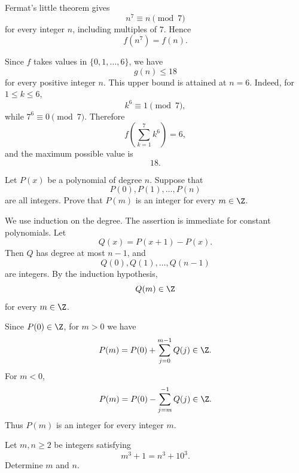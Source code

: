     \begin{solution}
        Fermat's little theorem gives
        \[
            n^7\equiv n\pmod7
        \]
        for every integer $n$, including multiples of $7$. Hence
        \[
            f(n^7)=f(n).
        \]

        Since $f$ takes values in $\{0,1,\ldots,6\}$, we have
        \[
            g(n)\leq18
        \]
        for every positive integer $n$. This upper bound is attained at $n=6$.
        Indeed, for $1\leq k\leq6$,
        \[
            k^6\equiv1\pmod7,
        \]
        while $7^6\equiv0\pmod7$. Therefore
        \[
            f\left(\sum_{k=1}^{7}k^6\right)=6,
        \]
        and the maximum possible value is
        \[
            \boxed{18}.
        \]
    \end{solution}

    \begin{expectedproblem}
        Let $P(x)$ be a polynomial of degree $n$. Suppose that
        \[
            P(0),P(1),\ldots,P(n)
        \]
        are all integers. Prove that $P(m)$ is an integer for every
        $m\in\Z$.
    \end{expectedproblem}

    \begin{solution}
        We use induction on the degree. The assertion is immediate for constant
        polynomials. Let
        \[
            Q(x)=P(x+1)-P(x).
        \]
        Then $Q$ has degree at most $n-1$, and
        \[
            Q(0),Q(1),\ldots,Q(n-1)
        \]
        are integers. By the induction hypothesis,
        \[
            Q(m)\in\Z
        \]
        for every $m\in\Z$.

        Since $P(0)\in\Z$, for $m>0$ we have
        \[
            P(m)
            =
            P(0)+\sum_{j=0}^{m-1}Q(j)
            \in\Z.
        \]
        For $m<0$,
        \[
            P(m)
            =
            P(0)-\sum_{j=m}^{-1}Q(j)
            \in\Z.
        \]
        Thus $P(m)$ is an integer for every integer $m$.
    \end{solution}

    \begin{expectedproblem}
        Let $m,n\geq2$ be integers satisfying
        \[
            m^3+1=n^3+10^3.
        \]
        Determine $m$ and $n$.
    \end{expectedproblem}

